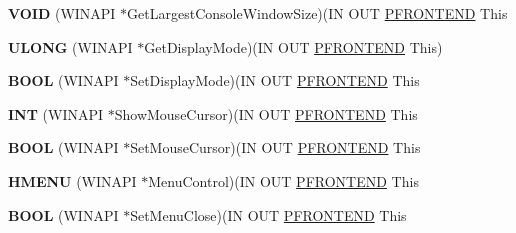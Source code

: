 \begin{DoxyCompactItemize}
{\bfseries V\+O\+ID} (W\+I\+N\+A\+PI $\ast$Get\+Largest\+Console\+Window\+Size)(IN O\+UT \hyperlink{struct___f_r_o_n_t_e_n_d}{P\+F\+R\+O\+N\+T\+E\+ND} This
\item 
\mbox{\label{struct___f_r_o_n_t_e_n_d___v_t_b_l_af90ef23f80e993299a6026a52503ec93}} 
{\bfseries U\+L\+O\+NG} (W\+I\+N\+A\+PI $\ast$Get\+Display\+Mode)(IN O\+UT \hyperlink{struct___f_r_o_n_t_e_n_d}{P\+F\+R\+O\+N\+T\+E\+ND} This)
\item 
\mbox{\label{struct___f_r_o_n_t_e_n_d___v_t_b_l_a48536ad89009c40738c4017587ab8825}} 
{\bfseries B\+O\+OL} (W\+I\+N\+A\+PI $\ast$Set\+Display\+Mode)(IN O\+UT \hyperlink{struct___f_r_o_n_t_e_n_d}{P\+F\+R\+O\+N\+T\+E\+ND} This
\item 
\mbox{\label{struct___f_r_o_n_t_e_n_d___v_t_b_l_ae9d8dddf5bf1d5a7686266460d91f04c}} 
{\bfseries I\+NT} (W\+I\+N\+A\+PI $\ast$Show\+Mouse\+Cursor)(IN O\+UT \hyperlink{struct___f_r_o_n_t_e_n_d}{P\+F\+R\+O\+N\+T\+E\+ND} This
\item 
\mbox{\label{struct___f_r_o_n_t_e_n_d___v_t_b_l_a8296a442ee003f1d77ea5bf817ba58cf}} 
{\bfseries B\+O\+OL} (W\+I\+N\+A\+PI $\ast$Set\+Mouse\+Cursor)(IN O\+UT \hyperlink{struct___f_r_o_n_t_e_n_d}{P\+F\+R\+O\+N\+T\+E\+ND} This
\item 
\mbox{\label{struct___f_r_o_n_t_e_n_d___v_t_b_l_aac3b75c4b8ed38e2f37bb5b3b530038b}} 
{\bfseries H\+M\+E\+NU} (W\+I\+N\+A\+PI $\ast$Menu\+Control)(IN O\+UT \hyperlink{struct___f_r_o_n_t_e_n_d}{P\+F\+R\+O\+N\+T\+E\+ND} This
\item 
\mbox{\label{struct___f_r_o_n_t_e_n_d___v_t_b_l_a15e8cfbf4d40e7f05fb83e61cfde00ea}} 
{\bfseries B\+O\+OL} (W\+I\+N\+A\+PI $\ast$Set\+Menu\+Close)(IN O\+UT \hyperlink{struct___f_r_o_n_t_e_n_d}{P\+F\+R\+O\+N\+T\+E\+ND} This
\end{DoxyCompactItemize}
